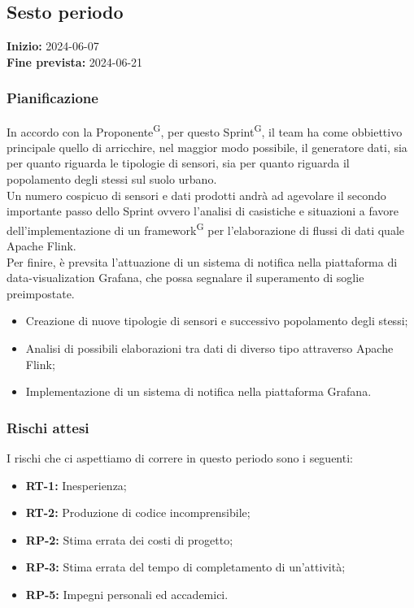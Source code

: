 \documentclass[8pt]{article}
\newcommand{\glossterm}[1]{#1\textsuperscript{G}} %
\begin{document}
\subsection{Sesto periodo} 
\textbf{Inizio:} 2024-06-07\\
\textbf{Fine prevista:} 2024-06-21
\subsubsection{Pianificazione}
In accordo con la \glossterm{Proponente}, per questo \glossterm{Sprint}, il team ha come obbiettivo principale quello di arricchire, nel maggior modo possibile, il generatore dati, sia per quanto riguarda le tipologie di sensori, sia per quanto riguarda il popolamento degli stessi sul suolo urbano. \\
Un numero cospicuo di sensori e dati prodotti andrà ad agevolare il secondo importante passo dello Sprint ovvero l'analisi di casistiche e situazioni a favore dell'implementazione di un \glossterm{framework} per l'elaborazione di flussi di dati quale Apache Flink.\\
Per finire, è prevsita l'attuazione di un sistema di notifica nella piattaforma di data-visualization Grafana, che possa segnalare il superamento di soglie preimpostate.
\begin{itemize}
    \setlength{\itemsep}{0em}
        \item Creazione di nuove tipologie di sensori e successivo popolamento degli stessi;
        \item Analisi di possibili elaborazioni tra dati di diverso tipo attraverso Apache Flink;
        \item Implementazione di un sistema di notifica nella piattaforma Grafana.
    \end{itemize}

\subsubsection{Rischi attesi}
I rischi che ci aspettiamo di correre in questo periodo sono i seguenti: 
\begin{itemize}
    \setlength{\itemsep}{0em}
        \item \textbf{RT-1:} Inesperienza;
        \item \textbf{RT-2:} Produzione di codice incomprensibile;
        \item \textbf{RP-2:} Stima errata dei costi di progetto;
        \item \textbf{RP-3:} Stima errata del tempo di completamento di un'attività;
        \item \textbf{RP-5:} Impegni personali ed accademici.
\end{itemize}
\clearpage
\end{document}
